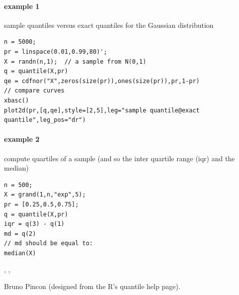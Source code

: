 \begin{examples}
\paragraph{example 1} sample quantiles versus exact quantiles for the Gaussian distribution
\begin{Verbatim}
n = 5000;
pr = linspace(0.01,0.99,80)';
X = randn(n,1);  // a sample from N(0,1)
q = quantile(X,pr)
qe = cdfnor("X",zeros(size(pr)),ones(size(pr)),pr,1-pr)
// compare curves
xbasc()
plot2d(pr,[q,qe],style=[2,5],leg="sample quantile@exact quantile",leg_pos="dr")
\end{Verbatim}

\paragraph{example 2} compute quartiles of a sample (and so the inter quartile range (iqr) and the median)
\begin{Verbatim}
n = 500;
X = grand(1,n,"exp",5);
pr = [0.25,0.5,0.75];
q = quantile(X,pr)
iqr = q(3) - q(1)
md = q(2)
// md should be equal to:
median(X)
\end{Verbatim}

\end{examples}

\begin{manseealso}
   , , 
\end{manseealso}

\begin{authors}
  Bruno Pincon (designed from the R's quantile help page).
\end{authors}
